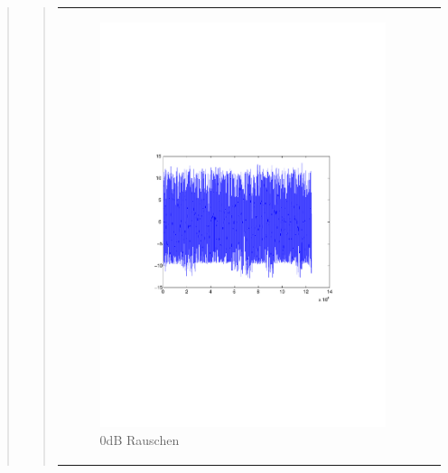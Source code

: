 \begin{quote}
\begin{quote}
\begin{center}
\begin{tabular}{ll}
                   \hspace{-4.5cm}
                   \begin{minipage}{0.6\textwidth}
        
                       \begin{figure}[H]
                           \includegraphics[scale=0.55, trim = 35mm 85mm 40mm 95mm, clip]{./Bilder/Rauschen0dB}
                           \caption{0dB Rauschen}
                       \end{figure}
        
                   \end{minipage}
        

\end{tabular}
\end{center}
\end{quote}
\end{quote}

